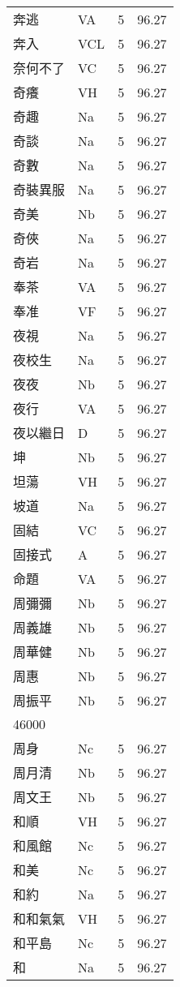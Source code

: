 \documentclass[twocolumn]{book}
\begin{document}
\begin{supertabular}{llrr}
奔逃 & VA & 5 &  96.27\\
奔入 & VCL & 5 &  96.27\\
奈何不了 & VC & 5 &  96.27\\
奇癢 & VH & 5 &  96.27\\
奇趣 & Na & 5 &  96.27\\
奇談 & Na & 5 &  96.27\\
奇數 & Na & 5 &  96.27\\
奇裝異服 & Na & 5 &  96.27\\
奇美 & Nb & 5 &  96.27\\
奇俠 & Na & 5 &  96.27\\
奇岩 & Na & 5 &  96.27\\
奉茶 & VA & 5 &  96.27\\
奉准 & VF & 5 &  96.27\\
夜視 & Na & 5 &  96.27\\
夜校生 & Na & 5 &  96.27\\
夜夜 & Nb & 5 &  96.27\\
夜行 & VA & 5 &  96.27\\
夜以繼日 & D & 5 &  96.27\\
坤 & Nb & 5 &  96.27\\
坦蕩 & VH & 5 &  96.27\\
坡道 & Na & 5 &  96.27\\
固結 & VC & 5 &  96.27\\
固接式 & A & 5 &  96.27\\
命題 & VA & 5 &  96.27\\
周彌彌 & Nb & 5 &  96.27\\
周義雄 & Nb & 5 &  96.27\\
周華健 & Nb & 5 &  96.27\\
周惠 & Nb & 5 &  96.27\\
周振平 & Nb & 5 &  96.27\\
46000\\
周身 & Nc & 5 &  96.27\\
周月清 & Nb & 5 &  96.27\\
周文王 & Nb & 5 &  96.27\\
和順 & VH & 5 &  96.27\\
和風館 & Nc & 5 &  96.27\\
和美 & Nc & 5 &  96.27\\
和約 & Na & 5 &  96.27\\
和和氣氣 & VH & 5 &  96.27\\
和平島 & Nc & 5 &  96.27\\
和 & Na & 5 &  96.27\\

\end{supertabular}
\end{document}

